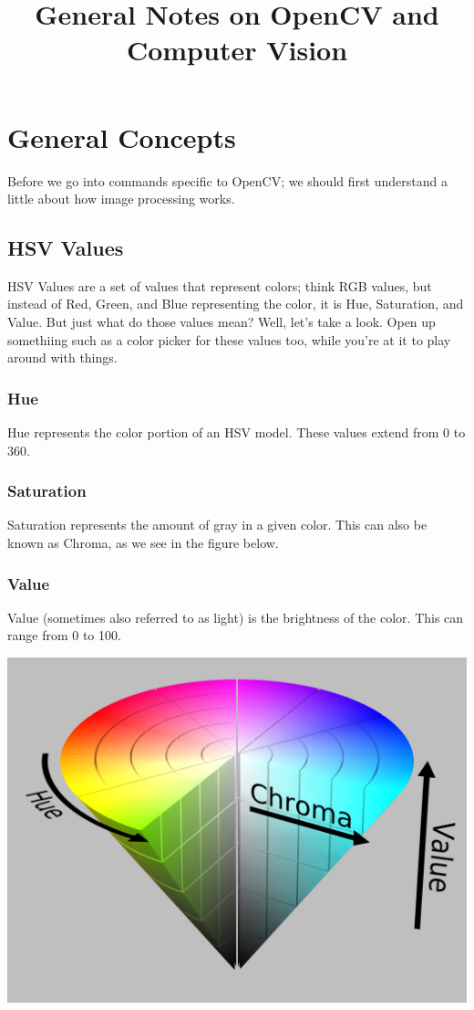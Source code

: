 \documentclass[12pt]{article}
\begin{document}
\title{General Notes on OpenCV and Computer Vision}
\author{}
\date{}
\maketitle


\section{General Concepts}
Before we go into commands specific to OpenCV; we should first understand a little about how image processing works.
\subsection*{HSV Values}
HSV Values are a set of values that represent colors; think RGB values, but instead of Red, Green, and Blue representing the color, it is Hue, Saturation, and Value. But just what do those values mean? Well, let's take a look. Open up somethiing such as a color picker for these values too, while you're at it to play around with things.
\subsubsection*{Hue}
Hue represents the color portion of an HSV model. These values extend from 0 to 360.
\subsubsection*{Saturation}
Saturation represents the amount of gray in a given color. This can also be known as Chroma, as we see in the figure below.
\subsubsection*{Value}
Value (sometimes also referred to as light) is the brightness of the color. This can range from 0 to 100.

\includegraphics[width=\textwidth]{HSVcolormodel}
\end{document}
